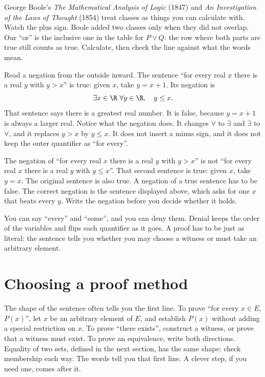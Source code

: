 George Boole's \emph{The Mathematical Analysis of Logic} (1847) and \emph{An Investigation of the Laws of Thought} (1854) treat classes as things you can calculate with. Watch the plus sign. Boole added two classes only when they did not overlap. Our ``or'' is the inclusive one in the table for $P\lor Q$: the row where both parts are true still counts as true. Calculate, then check the line against what the words mean.


Read a negation from the outside inward. The sentence ``for every real $x$ there is a real $y$ with $y>x$'' is true: given $x$, take $y=x+1$. Its negation is
\[
\exists x\in\R\ \forall y\in\R,\quad y\le x.
\]
That sentence says there is a greatest real number. It is false, because $y=x+1$ is always a larger real. Notice what the negation does. It changes $\forall$ to $\exists$ and $\exists$ to $\forall$, and it replaces $y>x$ by $y\le x$. It does not insert a minus sign, and it does not keep the outer quantifier as ``for every''.

\begin{examplex}
The negation of ``for every real $x$ there is a real $y$ with $y>x$'' is not ``for every real $x$ there is a real $y$ with $y\le x$''. That second sentence is true: given $x$, take $y=x$. The original sentence is also true. A negation of a true sentence has to be false. The correct negation is the sentence displayed above, which asks for one $x$ that beats every $y$. Write the negation before you decide whether it holds.
\end{examplex}

You can say ``every'' and ``some'', and you can deny them. Denial keeps the order of the variables and flips each quantifier as it goes. A proof has to be just as literal: the sentence tells you whether you may choose a witness or must take an arbitrary element.

\section{Choosing a proof method}

The shape of the sentence often tells you the first line. To prove ``for every $x\in E$, $P(x)$'', let $x$ be an arbitrary element of $E$, and establish $P(x)$ without adding a special restriction on $x$. To prove ``there exists'', construct a witness, or prove that a witness must exist. To prove an equivalence, write both directions. Equality of two sets, defined in the next section, has the same shape: check membership each way. The words tell you that first line. A clever step, if you need one, comes after it.

